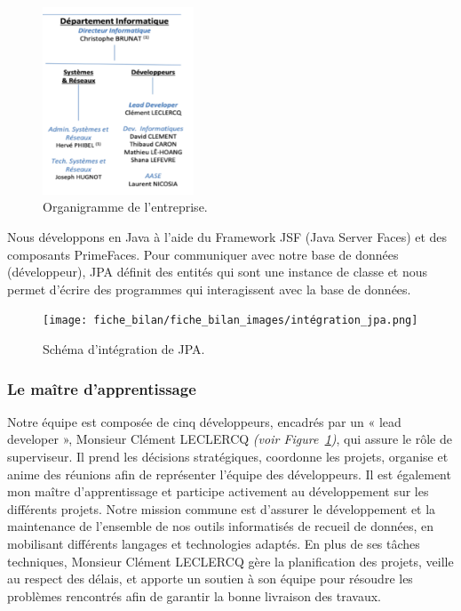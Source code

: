 \begin{figure}[H]
    \centering
    \includegraphics[width=0.4\textwidth]{fiche_bilan/fiche_bilan_images/organigramme_info.png} 
    \caption{Organigramme de l'entreprise.}
    \label{fig:organigramme}
\end{figure}
Nous développons en Java à l’aide du Framework JSF (Java Server Faces) et
des composants PrimeFaces.
Pour communiquer avec notre base de données (développeur), JPA définit des
entités qui sont une instance de classe et nous permet d’écrire des
programmes qui interagissent avec la base de données.
\begin{figure}[H]
    \centering
    \texttt{[image: fiche\_bilan/fiche\_bilan\_images/intégration\_jpa.png]} 
    \caption{Schéma d'intégration de JPA.}
\end{figure}

\subsubsection{Le maître d'apprentissage}
Notre équipe est composée de cinq développeurs, encadrés par un « lead developer », Monsieur Clément LECLERCQ \emph{(voir Figure~\ref{fig:organigramme})}, qui assure le rôle de superviseur. Il prend les décisions stratégiques, coordonne les projets, organise et anime des réunions afin de représenter l’équipe des développeurs. Il est également mon maître d’apprentissage et participe activement au développement sur les différents projets.
Notre mission commune est d’assurer le développement et la maintenance de l’ensemble de nos outils informatisés de recueil de données, en mobilisant différents langages et technologies adaptés. En plus de ses tâches techniques, Monsieur Clément LECLERCQ gère la planification des projets, veille au respect des délais, et apporte un soutien à son équipe pour résoudre les problèmes rencontrés afin de garantir la bonne livraison des travaux.

